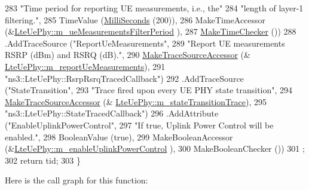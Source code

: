 \begin{DoxyCode}
283                    \textcolor{stringliteral}{"Time period for reporting UE measurements, i.e., the"}
284                    \textcolor{stringliteral}{"length of layer-1 filtering."},
285                    TimeValue (\hyperlink{group__timecivil_gaf26127cf4571146b83a92ee18679c7a9}{MilliSeconds} (200)),
286                    MakeTimeAccessor (&\hyperlink{classns3_1_1LteUePhy_acb16dbec02523a0642f73eb98292ed2f}{LteUePhy::m\_ueMeasurementsFilterPeriod}
      ),
287                    \hyperlink{group__time_ga7032965bd4afa578691d88c09e4481c1}{MakeTimeChecker} ())
288     .AddTraceSource (\textcolor{stringliteral}{"ReportUeMeasurements"},
289                      \textcolor{stringliteral}{"Report UE measurements RSRP (dBm) and RSRQ (dB)."},
290                      \hyperlink{group__tracing_gab21a770b9855af4e8f69f7531ea4a6b0}{MakeTraceSourceAccessor} (&
      \hyperlink{classns3_1_1LteUePhy_a6441358870b99ebb18253bc646702af9}{LteUePhy::m\_reportUeMeasurements}),
291                      \textcolor{stringliteral}{"ns3::LteUePhy::RsrpRsrqTracedCallback"})
292     .AddTraceSource (\textcolor{stringliteral}{"StateTransition"},
293                      \textcolor{stringliteral}{"Trace fired upon every UE PHY state transition"},
294                      \hyperlink{group__tracing_gab21a770b9855af4e8f69f7531ea4a6b0}{MakeTraceSourceAccessor} (&
      \hyperlink{classns3_1_1LteUePhy_ab86ca96c3346a3d9143e03faf4093f13}{LteUePhy::m\_stateTransitionTrace}),
295                      \textcolor{stringliteral}{"ns3::LteUePhy::StateTracedCallback"})
296     .AddAttribute (\textcolor{stringliteral}{"EnableUplinkPowerControl"},
297                    \textcolor{stringliteral}{"If true, Uplink Power Control will be enabled."},
298                    BooleanValue (\textcolor{keyword}{true}),
299                    MakeBooleanAccessor (&\hyperlink{classns3_1_1LteUePhy_a894d55731114732593b7d7eef8cb94b2}{LteUePhy::m\_enableUplinkPowerControl}
      ),
300                    MakeBooleanChecker ())
301   ;
302   \textcolor{keywordflow}{return} tid;
303 \}
\end{DoxyCode}


Here is the call graph for this function\+:


